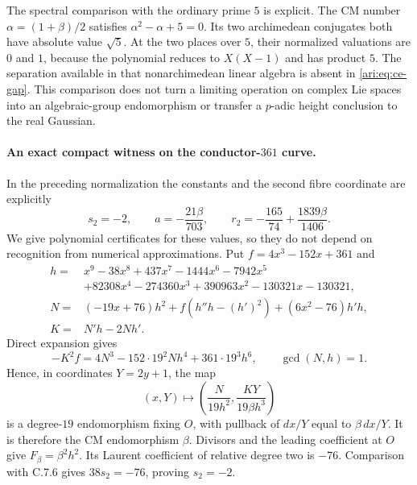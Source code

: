 The spectral comparison with the ordinary prime $5$ is
explicit. The CM number $\alpha=(1+\beta)/2$ satisfies
$\alpha^2-\alpha+5=0$. Its two archimedean conjugates
both have absolute value $\sqrt5$. At the two places over
$5$, their normalized valuations are $0$ and $1$, because
the polynomial reduces to $X(X-1)$ and has product $5$.
The separation available in that nonarchimedean linear
algebra is absent in \eqref{ari:eq:ce-gap}. This comparison
does not turn a limiting operation on complex Lie spaces
into an algebraic-group endomorphism or transfer a
$p$-adic height conclusion to the real Gaussian.

\paragraph{An exact compact witness on the conductor-$361$ curve.}
In the preceding normalization the constants and the second
fibre coordinate are explicitly
\begin{equation}\label{ari:eq:ce-explicit-witness}
 s_2=-2,\qquad a=-\frac{21\beta}{703},\qquad
 r_2=-\frac{165}{74}+\frac{1839\beta}{1406}.
\end{equation}
We give polynomial certificates for these values, so they
do not depend on recognition from numerical approximations.
Put $f=4x^3-152x+361$ and
\[
 \begin{aligned}
 h={}&x^9-38x^8+437x^7-1444x^6-7942x^5\\
     &+82308x^4-274360x^3+390963x^2-130321x-130321,\\
 N={}&(-19x+76)h^2+f(h''h-(h')^2)+(6x^2-76)h'h,\\
 K={}&N'h-2Nh'.
 \end{aligned}
\]
Direct expansion gives
\[
 -K^2f=4N^3-152\cdot19^2Nh^4+361\cdot19^3h^6,
 \qquad \gcd(N,h)=1.
\]
Hence, in coordinates $Y=2y+1$, the map
\[
 (x,Y)\longmapsto
 \left(\frac{N}{19h^2},\frac{KY}{19\beta h^3}\right)
\]
is a degree-$19$ endomorphism fixing $O$, with pullback of
$dx/Y$ equal to $\beta\,dx/Y$. It is therefore the CM
endomorphism $\beta$. Divisors and the leading coefficient
at $O$ give $F_\beta=\beta^2h^2$. Its Laurent coefficient
of relative degree two is $-76$. Comparison with C.7.6
gives $38s_2=-76$, proving $s_2=-2$.

